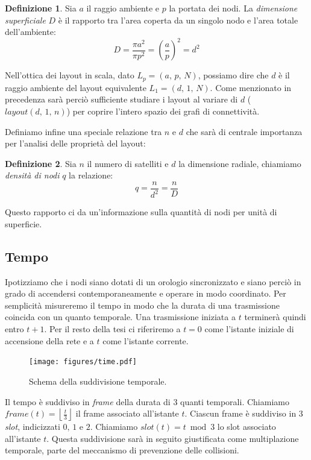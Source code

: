 \documentclass[a4paper,11pt]{article}
\theoremstyle{definition}
\newtheorem{definition}{Definizione}
\begin{document}
\begin{definition}
Sia $a$ il raggio ambiente e $p$ la portata dei nodi. La \emph{dimensione superficiale} $D$ è il rapporto tra l'area coperta da un singolo nodo e l'area totale dell'ambiente:
\begin{equation*}
D = \frac{\pi a^2}{\pi p^2} = \left(\frac{a}{p}\right)^2 = d^2
\end{equation*}
\end{definition}

Nell'ottica dei layout in scala, dato $L_p = (a,\,p,\,N)$, possiamo dire che $d$ è il raggio ambiente del layout equivalente $L_1 = (d,\,1,\,N)$. Come menzionato in precedenza sarà perciò sufficiente studiare i layout al variare di $d$ ($layout(d,\,1,\,n)$) per coprire l'intero spazio dei grafi di connettività.

Definiamo infine una speciale relazione tra $n$ e $d$ che sarà di centrale importanza per l'analisi delle proprietà del layout:

\begin{definition}
Sia $n$ il numero di satelliti e $d$ la dimensione radiale, chiamiamo \emph{densità di nodi} $q$ la relazione:
\begin{equation*}
q = \frac{n}{d^2} = \frac{n}{D}
\end{equation*}
\end{definition}

Questo rapporto ci da un'informazione sulla quantità di nodi per unità di superficie.

\subsection{Tempo}

Ipotizziamo che i nodi siano dotati di un orologio sincronizzato e siano perciò in grado di accendersi contemporaneamente e operare in modo coordinato. Per semplicità misureremo il tempo in modo che la durata di una trasmissione coincida con un quanto temporale. Una trasmissione iniziata a $t$ terminerà quindi entro $t+1$. Per il resto della tesi ci riferiremo a $t=0$ come l'istante iniziale di accensione della rete e a $t$ come l'istante corrente.

\begin{figure}[H]
\centering
\texttt{[image: figures/time.pdf]}
\caption{Schema della suddivisione temporale.}
\end{figure}

Il tempo è suddiviso in \emph{frame} della durata di 3 quanti temporali. Chiamiamo $frame(t) =  \left\lfloor\frac{t}{3}\right\rfloor$ il frame associato all'istante $t$. Ciascun frame è suddiviso in 3 \emph{slot}, indicizzati $0,\,1 \text{ e } 2$. Chiamiamo $slot(t) = t \bmod 3$ lo slot associato all'istante $t$. Questa suddivisione sarà in seguito giustificata come multiplazione temporale, parte del meccanismo di prevenzione delle collisioni.
\end{document}
